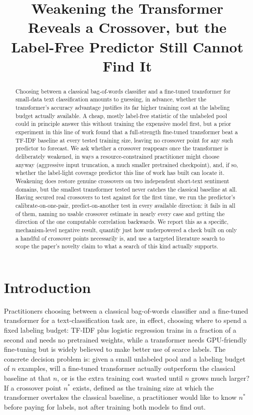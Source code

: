\documentclass[11pt,letterpaper]{article}
\title{Weakening the Transformer Reveals a Crossover, but the Label-Free Predictor Still Cannot Find It}
\author{}
\date{}
\begin{document}
\maketitle

\begin{abstract}
Choosing between a classical bag-of-words classifier and a fine-tuned transformer for small-data text classification amounts to guessing, in advance, whether the transformer's accuracy advantage justifies its far higher training cost at the labeling budget actually available. A cheap, mostly label-free statistic of the unlabeled pool could in principle answer this without training the expensive model first, but a prior experiment in this line of work found that a full-strength fine-tuned transformer beat a TF-IDF baseline at every tested training size, leaving no crossover point for any such predictor to forecast. We ask whether a crossover reappears once the transformer is deliberately weakened, in ways a resource-constrained practitioner might choose anyway (aggressive input truncation, a much smaller pretrained checkpoint), and, if so, whether the label-light coverage predictor this line of work has built can locate it. Weakening does restore genuine crossovers on two independent short-text sentiment domains, but the smallest transformer tested never catches the classical baseline at all. Having secured real crossovers to test against for the first time, we run the predictor's calibrate-on-one-pair, predict-on-another test in every available direction: it fails in all of them, naming no usable crossover estimate in nearly every case and getting the direction of the one computable correlation backwards. We report this as a specific, mechanism-level negative result, quantify just how underpowered a check built on only a handful of crossover points necessarily is, and use a targeted literature search to scope the paper's novelty claim to what a search of this kind actually supports.
\end{abstract}

\section{Introduction}

Practitioners choosing between a classical bag-of-words classifier and a fine-tuned transformer for a text-classification task are, in effect, choosing where to spend a fixed labeling budget: TF-IDF plus logistic regression trains in a fraction of a second and needs no pretrained weights, while a transformer needs GPU-friendly fine-tuning but is widely believed to make better use of scarce labels. The concrete decision problem is: given a small unlabeled pool and a labeling budget of $n$ examples, will a fine-tuned transformer actually outperform the classical baseline at that $n$, or is the extra training cost wasted until $n$ grows much larger? If a crossover point $n^*$ exists, defined as the training size at which the transformer overtakes the classical baseline, a practitioner would like to know $n^*$ before paying for labels, not after training both models to find out.
\end{document}
